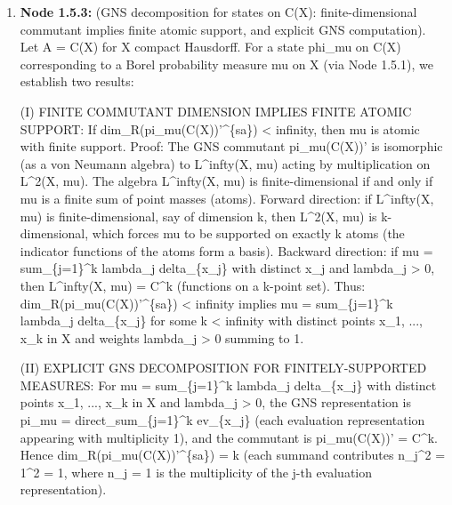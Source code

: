 \documentclass{article}
\begin{document}
\begin{enumerate}
\begin{enumerate}
This is a deduction depending on Node 1.5.1 (abelian algebra setup), Schur's lemma (external: Takesaki I, Prop. I.9.1), and the Gelfand-Naimark theorem for commutative C*-algebras (external: Kadison-Ringrose I, Thm 4.4.3).

  Type: claim, Inference: assumption, Status: pending, Taint: unresolved

\item \textbf{Node 1.5.3:} (GNS decomposition for states on C(X): finite-dimensional commutant implies finite atomic support, and explicit GNS computation). Let A = C(X) for X compact Hausdorff. For a state phi\_mu on C(X) corresponding to a Borel probability measure mu on X (via Node 1.5.1), we establish two results:

(I) FINITE COMMUTANT DIMENSION IMPLIES FINITE ATOMIC SUPPORT: If dim\_R(pi\_mu(C(X))'\textasciicircum{}\{sa\}) < infinity, then mu is atomic with finite support. Proof: The GNS commutant pi\_mu(C(X))' is isomorphic (as a von Neumann algebra) to L\textasciicircum{}infty(X, mu) acting by multiplication on L\textasciicircum{}2(X, mu). The algebra L\textasciicircum{}infty(X, mu) is finite-dimensional if and only if mu is a finite sum of point masses (atoms). Forward direction: if L\textasciicircum{}infty(X, mu) is finite-dimensional, say of dimension k, then L\textasciicircum{}2(X, mu) is k-dimensional, which forces mu to be supported on exactly k atoms (the indicator functions of the atoms form a basis). Backward direction: if mu = sum\_\{j=1\}\textasciicircum{}k lambda\_j delta\_\{x\_j\} with distinct x\_j and lambda\_j > 0, then L\textasciicircum{}infty(X, mu) = C\textasciicircum{}k (functions on a k-point set). Thus: dim\_R(pi\_mu(C(X))'\textasciicircum{}\{sa\}) < infinity implies mu = sum\_\{j=1\}\textasciicircum{}k lambda\_j delta\_\{x\_j\} for some k < infinity with distinct points x\_1, ..., x\_k in X and weights lambda\_j > 0 summing to 1.

(II) EXPLICIT GNS DECOMPOSITION FOR FINITELY-SUPPORTED MEASURES: For mu = sum\_\{j=1\}\textasciicircum{}k lambda\_j delta\_\{x\_j\} with distinct points x\_1, ..., x\_k in X and lambda\_j > 0, the GNS representation is pi\_mu = direct\_sum\_\{j=1\}\textasciicircum{}k ev\_\{x\_j\} (each evaluation representation appearing with multiplicity 1), and the commutant is pi\_mu(C(X))' = C\textasciicircum{}k. Hence dim\_R(pi\_mu(C(X))'\textasciicircum{}\{sa\}) = k (each summand contributes n\_j\textasciicircum{}2 = 1\textasciicircum{}2 = 1, where n\_j = 1 is the multiplicity of the j-th evaluation representation).


\end{enumerate}
\end{enumerate}
\end{document}
